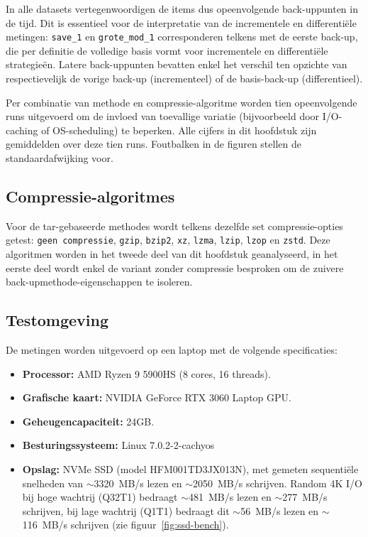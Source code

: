 In alle datasets vertegenwoordigen de items dus opeenvolgende back-up\-punten in de tijd. Dit is essentieel voor de interpretatie van de incrementele en differentiële metingen: \texttt{save\_1} en \texttt{grote\_mod\_1} corresponderen telkens met de eerste back-up, die per definitie de volledige basis vormt voor incrementele en differentiële strategieën. Latere back-uppunten bevatten enkel het verschil ten opzichte van respectievelijk de vorige back-up (incrementeel) of de basis-back-up (differentieel).

Per combinatie van methode en compressie-algoritme worden tien opeenvolgende runs uitgevoerd om de invloed van toevallige variatie (bijvoorbeeld door I/O-caching of OS-scheduling) te beperken. Alle cijfers in dit hoofdstuk zijn gemiddelden over deze tien runs. Foutbalken in de figuren stellen de standaardafwijking voor.

\subsection{Compressie-algoritmes}

Voor de tar-gebaseerde methodes wordt telkens dezelfde set compressie-opties getest: \texttt{geen compressie}, \texttt{gzip}, \texttt{bzip2}, \texttt{xz}, \texttt{lzma}, \texttt{lzip}, \texttt{lzop} en \texttt{zstd}. Deze algoritmen worden in het tweede deel van dit hoofdstuk geanalyseerd, in het eerste deel wordt enkel de variant zonder compressie besproken om de zuivere back-upmethode-eigenschappen te isoleren.

\subsection{Testomgeving}

De metingen worden uitgevoerd op een laptop met de volgende specificaties:

\begin{itemize}
    \item \textbf{Processor:} AMD Ryzen 9 5900HS (8 cores, 16 threads).
    \item \textbf{Grafische kaart:} NVIDIA GeForce RTX 3060 Laptop GPU.
    \item \textbf{Geheugencapaciteit:} 24GB.
    \item \textbf{Besturingssysteem:} Linux 7.0.2-2-cachyos
    \item \textbf{Opslag:} NVMe SSD (model HFM001TD3JX013N), met gemeten sequentiële snelheden van $\sim$3320~MB/s lezen en $\sim$2050~MB/s schrijven. Random 4K I/O bij hoge wachtrij (Q32T1) bedraagt $\sim$481~MB/s lezen en $\sim$277~MB/s schrijven, bij lage wachtrij (Q1T1) bedraagt dit $\sim$56~MB/s lezen en $\sim$116~MB/s schrijven (zie figuur~\ref{fig:ssd-bench}).
\end{itemize}

